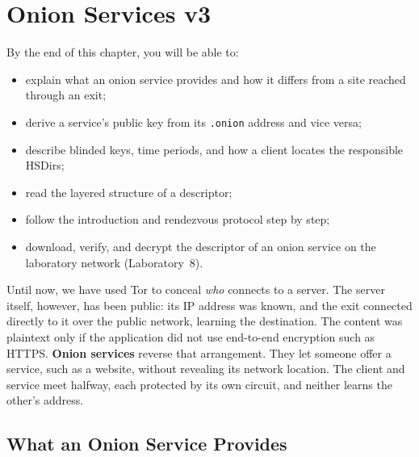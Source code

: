 \chapter{Onion Services v3}\label{cap:14-onion-services}

\begin{obiettivi}
By the end of this chapter, you will be able to:
\begin{itemize}[nosep]
  \item explain what an onion service provides and how it differs from a site reached through an exit;
  \item derive a service's public key from its \texttt{.onion} address and vice versa;
  \item describe blinded keys, time periods, and how a client locates the responsible HSDirs;
  \item read the layered structure of a descriptor;
  \item follow the introduction and rendezvous protocol step by step;
  \item download, verify, and decrypt the descriptor of an onion service on the laboratory network (Laboratory~8).
\end{itemize}
\end{obiettivi}

Until now, we have used Tor to conceal \emph{who} connects to a server. The server itself, however, has been public: its IP address was known, and the exit connected directly to it over the public network, learning the destination. The content was plaintext only if the application did not use end-to-end encryption such as HTTPS. \textbf{Onion services} reverse that arrangement. They let someone offer a service, such as a website, without revealing its network location. The client and service meet halfway, each protected by its own circuit, and neither learns the other's address.

\section{What an Onion Service Provides}\label{sec:os-proprieta}


